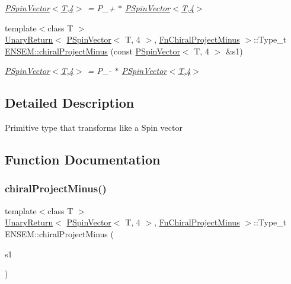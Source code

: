 \begin{DoxyCompactItemize}
\begin{DoxyCompactList}\small\item\em \mbox{\hyperlink{classENSEM_1_1PSpinVector_3_01T_00_014_01_4}{P\+Spin\+Vector$<$\+T,4$>$}} = P\+\_\++ $\ast$ \mbox{\hyperlink{classENSEM_1_1PSpinVector_3_01T_00_014_01_4}{P\+Spin\+Vector$<$\+T,4$>$}} \end{DoxyCompactList}\item 
{\footnotesize template$<$class T $>$ }\\\mbox{\hyperlink{structENSEM_1_1UnaryReturn}{Unary\+Return}}$<$ \mbox{\hyperlink{classENSEM_1_1PSpinVector}{P\+Spin\+Vector}}$<$ T, 4 $>$, \mbox{\hyperlink{structENSEM_1_1FnChiralProjectMinus}{Fn\+Chiral\+Project\+Minus}} $>$\+::Type\+\_\+t \mbox{\hyperlink{group__primspinvector_ga7af53ea534552edc873a7cb1f52a94e1}{E\+N\+S\+E\+M\+::chiral\+Project\+Minus}} (const \mbox{\hyperlink{classENSEM_1_1PSpinVector}{P\+Spin\+Vector}}$<$ T, 4 $>$ \&s1)
\begin{DoxyCompactList}\small\item\em \mbox{\hyperlink{classENSEM_1_1PSpinVector_3_01T_00_014_01_4}{P\+Spin\+Vector$<$\+T,4$>$}} = P\+\_\+-\/ $\ast$ \mbox{\hyperlink{classENSEM_1_1PSpinVector_3_01T_00_014_01_4}{P\+Spin\+Vector$<$\+T,4$>$}} \end{DoxyCompactList}\end{DoxyCompactItemize}


\subsection{Detailed Description}
Primitive type that transforms like a Spin vector 

\subsection{Function Documentation}
\mbox{\label{group__primspinvector_ga7af53ea534552edc873a7cb1f52a94e1}} 
\subsubsection{\texorpdfstring{chiralProjectMinus()}{chiralProjectMinus()}}
{\footnotesize\ttfamily template$<$class T $>$ \\
\mbox{\hyperlink{structENSEM_1_1UnaryReturn}{Unary\+Return}}$<$ \mbox{\hyperlink{classENSEM_1_1PSpinVector}{P\+Spin\+Vector}}$<$ T, 4 $>$, \mbox{\hyperlink{structENSEM_1_1FnChiralProjectMinus}{Fn\+Chiral\+Project\+Minus}} $>$\+::Type\+\_\+t E\+N\+S\+E\+M\+::chiral\+Project\+Minus (\begin{DoxyParamCaption}\item[{const \mbox{\hyperlink{classENSEM_1_1PSpinVector}{P\+Spin\+Vector}}$<$ T, 4 $>$ \&}]{s1 }\end{DoxyParamCaption})\hspace{0.3cm}{\ttfamily [inline]}}



